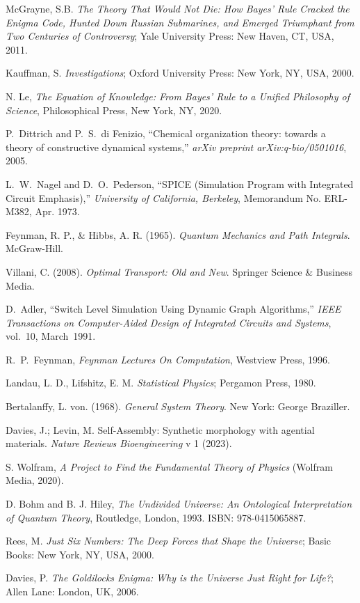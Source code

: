 \documentclass[preprint,12pt]{elsarticle}
\begin{document}
\begin{thebibliography}{999}
McGrayne, S.B. \textit{The Theory That Would Not Die: How Bayes' Rule Cracked the Enigma Code, Hunted Down Russian Submarines, and Emerged Triumphant from Two Centuries of Controversy}; Yale University Press: New Haven, CT, USA, 2011.

Kauffman, S. \textit{Investigations}; Oxford University Press: New York, NY, USA, 2000.

 N. Le, \textit{The Equation of Knowledge: From Bayes’ Rule to a Unified Philosophy of Science}, Philosophical Press, New York, NY, 2020.

P.~Dittrich and P.~S.~di Fenizio, ``Chemical organization theory: towards a theory of constructive dynamical systems,'' \emph{arXiv preprint arXiv:q-bio/0501016}, 2005.


L.~W.~Nagel and D.~O.~Pederson, ``SPICE (Simulation Program with Integrated Circuit Emphasis),'' 
{\em University of California, Berkeley}, Memorandum No. ERL-M382, Apr. 1973.

Feynman, R. P., \& Hibbs, A. R. (1965). \textit{Quantum Mechanics and Path Integrals}. McGraw-Hill.

Villani, C. (2008). \textit{Optimal Transport: Old and New}. Springer Science \& Business Media.


 D.~Adler, ``Switch Level Simulation Using Dynamic Graph Algorithms,''
{\em IEEE Transactions on Computer-Aided Design of Integrated Circuits and Systems}, vol.~10, March~1991.

R.~P.~Feynman, {\em Feynman Lectures On Computation}, Westview Press, 1996.

Landau, L. D., Lifshitz, E. M. \textit{Statistical Physics}; Pergamon Press, 1980.

Bertalanffy, L. von. (1968). \textit{General System Theory}. New York: George Braziller.

Davies, J.; Levin, M. Self-Assembly: Synthetic morphology with agential materials. \textit{Nature Reviews Bioengineering} v 1 (2023).

 S. Wolfram, \textit{A Project to Find the Fundamental Theory of Physics} (Wolfram Media, 2020).

D. Bohm and B. J. Hiley, \emph{The Undivided Universe: An Ontological Interpretation of Quantum Theory}, Routledge, London, 1993. ISBN: 978-0415065887.

Rees, M. \textit{Just Six Numbers: The Deep Forces that Shape the Universe}; Basic Books: New York, NY, USA, 2000.

Davies, P. \textit{The Goldilocks Enigma: Why is the Universe Just Right for Life?}; Allen Lane: London, UK, 2006.


\end{thebibliography}
\end{document}
